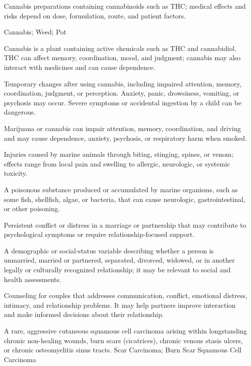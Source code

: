  Cannabis preparations containing cannabinoids such as THC; medical effects and risks depend on dose, formulation, route, and patient factors.

\synonyms
Cannabis; Weed; Pot

 Cannabis is a plant containing active chemicals such as THC and cannabidiol. THC can affect memory, coordination, mood, and judgment; cannabis may also interact with medicines and can cause dependence.

 Temporary changes after using cannabis, including impaired attention, memory, coordination, judgment, or perception. Anxiety, panic, drowsiness, vomiting, or psychosis may occur. Severe symptoms or accidental ingestion by a child can be dangerous.

 Marijuana or cannabis can impair attention, memory, coordination, and driving and may cause dependence, anxiety, psychosis, or respiratory harm when smoked.

 Injuries caused by marine animals through biting, stinging, spines, or venom; effects range from local pain and swelling to allergic, neurologic, or systemic toxicity.

 A poisonous substance produced or accumulated by marine organisms, such as some fish, shellfish, algae, or bacteria, that can cause neurologic, gastrointestinal, or other poisoning.

 Persistent conflict or distress in a marriage or partnership that may contribute to psychological symptoms or require relationship-focused support.

 A demographic or social-status variable describing whether a person is unmarried, married or partnered, separated, divorced, widowed, or in another legally or culturally recognized relationship; it may be relevant to social and health assessments.

 Counseling for couples that addresses communication, conflict, emotional distress, intimacy, and relationship problems. It may help partners improve interaction and make informed decisions about their relationship.

 A rare, aggressive cutaneous squamous cell carcinoma arising within longstanding chronic non-healing wounds, burn scars (cicatrices), chronic venous stasis ulcers, or chronic osteomyelitis sinus tracts.
\synonyms
Scar Carcinoma; Burn Scar Squamous Cell Carcinoma

